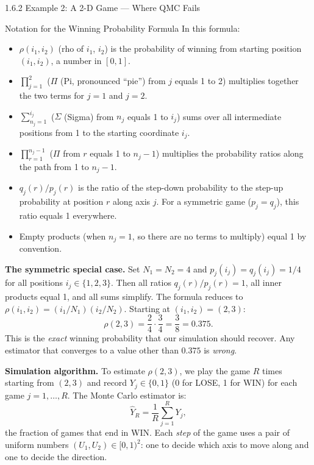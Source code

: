 \documentclass[aspectratio=169,10pt]{beamer}
\begin{document}
\begin{frame}[allowframebreaks]{1.6.2 Example 2: A 2-D Game --- Where QMC Fails}
  \begin{block}{Notation for the Winning Probability Formula}
    In this formula:
    \begin{itemize}
      \item $\rho(i_1, i_2)$ (rho of $i_1$, $i_2$) is the probability of
        winning from starting position $(i_1, i_2)$, a number in $[0,1]$.
      \item $\prod_{j=1}^{2}$ ($\Pi$ (Pi, pronounced ``pie'') from $j$ equals
        1 to 2) multiplies together the two terms for $j = 1$ and $j = 2$.
      \item $\sum_{n_j=1}^{i_j}$ ($\Sigma$ (Sigma) from $n_j$ equals 1 to
        $i_j$) sums over all intermediate positions from 1 to the starting
        coordinate $i_j$.
      \item $\prod_{r=1}^{n_j-1}$ ($\Pi$ from $r$ equals 1 to $n_j - 1$)
        multiplies the probability ratios along the path from 1 to $n_j - 1$.
      \item $q_j(r)/p_j(r)$ is the ratio of the step-down probability to the
        step-up probability at position $r$ along axis $j$.  For a symmetric
        game ($p_j = q_j$), this ratio equals 1 everywhere.
      \item Empty products (when $n_j = 1$, so there are no terms to multiply)
        equal 1 by convention.
    \end{itemize}
  \end{block}

  \textbf{The symmetric special case.}  Set $N_1 = N_2 = 4$ and $p_j(i_j) =
  q_j(i_j) = 1/4$ for all positions $i_j \in \{1, 2, 3\}$.  Then all ratios
  $q_j(r)/p_j(r) = 1$, all inner products equal 1, and all sums simplify.
  The formula reduces to $\rho(i_1, i_2) = (i_1/N_1)(i_2/N_2)$.  Starting at
  $(i_1, i_2) = (2, 3)$:
  \[
    \rho(2, 3) = \frac{2}{4} \cdot \frac{3}{4} = \frac{3}{8} = 0.375.
  \]
  This is the \emph{exact} winning probability that our simulation should
  recover.  Any estimator that converges to a value other than $0.375$ is
  \emph{wrong}.

  \framebreak

  \textbf{Simulation algorithm.}  To estimate $\rho(2, 3)$, we play the game
  $R$ times starting from $(2, 3)$ and record $Y_j \in \{0, 1\}$ (0 for LOSE,
  1 for WIN) for each game $j = 1, \ldots, R$.  The Monte Carlo estimator is:
  \[
    \hat{Y}_R = \frac{1}{R} \sum_{j=1}^R Y_j,
  \]
  the fraction of games that end in WIN.  Each \emph{step} of the game uses a
  pair of uniform numbers $(U_1, U_2) \in [0,1)^2$: one to decide which axis
  to move along and one to decide the direction.


\end{frame}
\end{document}
